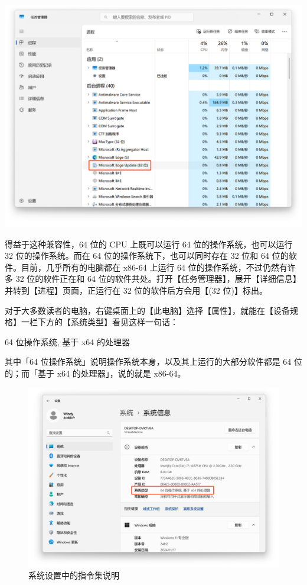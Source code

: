 \begin{note}
  \begin{center}
    \includegraphics[width=.6\textwidth]{assets/surpass/32bit_in_taskmgr.png}
    \vspace*{-2ex}
    \label{fig:32bit_in_taskmgr}
  \end{center}
  
  得益于这种兼容性，64 位的 CPU 上既可以运行 64 位的操作系统，也可以运行 32 位的操作系统。而在 64 位的操作系统下，也可以同时存在 32 位和 64 位的软件。目前，几乎所有的电脑都在 x86-64 上运行 64 位的操作系统，不过仍然有许多 32 位的软件正在和 64 位的软件共处。打开【任务管理器】，展开【详细信息】并转到【进程】页面，正运行在 32 位的软件后方会用【(32 位)】标出。
\end{note}

对于大多数读者的电脑，右键桌面上的【此电脑】选择【属性】，就能在【设备规格】一栏下方的【系统类型】看见这样一句话：
\begin{quoting}
  64 位操作系统, 基于 x64 的处理器
\end{quoting}
其中「64 位操作系统」说明操作系统本身，以及其上运行的大部分软件都是 64 位的；而「基于 x64 的处理器」，说的就是 x86-64。

\begin{figure}[htb!]
  \centering
  \includegraphics[width=.65\textwidth]{assets/surpass/x64_in_settings.png}
  \caption{系统设置中的指令集说明}
  \label{fig:x64_in_settings}
\end{figure}
\vspace*{-2ex}

